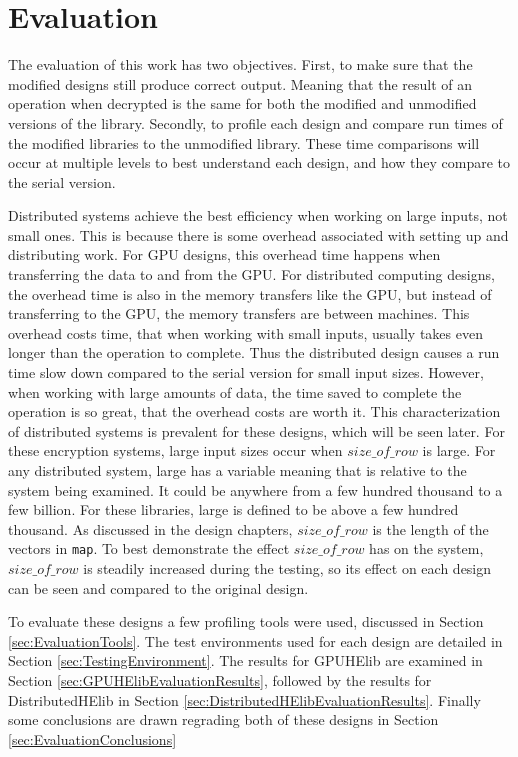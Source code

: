 \chapter{Evaluation} \label{chap:Evaluation}
The evaluation of this work has two objectives. First, to make sure that the modified designs still produce correct output. Meaning that the result of an operation when decrypted is the same for both the modified and unmodified versions of the library. Secondly, to profile each design and compare run times of the modified libraries to the unmodified library. These time comparisons will occur at multiple levels to best understand each design, and how they compare to the serial version.

Distributed systems achieve the best efficiency when working on large inputs, not small ones. This is because there is some overhead associated with setting up and distributing work. For GPU designs, this overhead time happens when transferring the data to and from the GPU. For distributed computing designs, the overhead time is also in the memory transfers like the GPU, but instead of transferring to the GPU, the memory transfers are between machines. This overhead costs time, that when working with small inputs, usually takes even longer than the operation to complete. Thus the distributed design causes a run time slow down compared to the serial version for small input sizes. However, when working with large amounts of data, the time saved to complete the operation is so great, that the overhead costs are worth it. This characterization of distributed systems is prevalent for these designs, which will be seen later. For these encryption systems, large input sizes occur when $size\_of\_row$ is large. For any distributed system, large has a variable meaning that is relative to the system being examined. It could be anywhere from a few hundred thousand to a few billion. For these libraries, large is defined to be above a few hundred thousand. As discussed in the design chapters, $size\_of\_row$ is the length of the vectors in \verb|map|. To best demonstrate the effect $size\_of\_row$ has on the system, $size\_of\_row$ is steadily increased during the testing, so its effect on each design can be seen and compared to the original design.

To evaluate these designs a few profiling tools were used, discussed in Section \ref{sec:EvaluationTools}. The test environments used for each design are detailed in Section \ref{sec:TestingEnvironment}. The results for GPUHElib are examined in Section \ref{sec:GPUHElibEvaluationResults}, followed by the results for DistributedHElib in Section \ref{sec:DistributedHElibEvaluationResults}. Finally some conclusions are drawn regrading both of these designs in Section \ref{sec:EvaluationConclusions}

